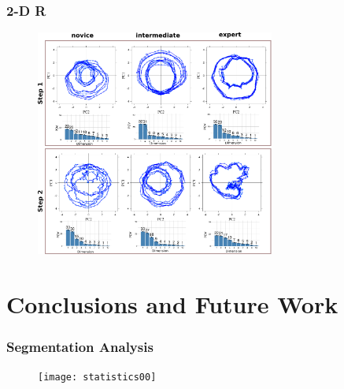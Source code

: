 \documentclass{beamer}
\begin{document}
 

\begin{frame}
\frametitle{2-D R}
\vspace{-0.7cm}


\begin{figure}[!htb]
\centering    
\includegraphics[width=0.7\textwidth]{main_figure_horizontal02}
\caption[PA]{}
  
\label{fig:sn}
\end{figure}



\end{frame}





  
\section{Conclusions and Future Work}


\begin{frame}
\frametitle{Segmentation Analysis}
\vspace{-0.7cm}


\begin{figure}[!htb]
\centering    
\texttt{[image: statistics00]}
\caption[PA]{}
  
\label{fig:sn}
\end{figure}



\end{frame}
\end{document}
